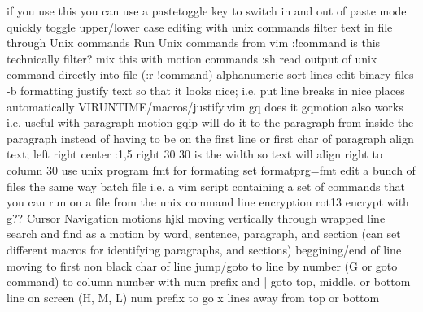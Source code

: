 \documentclass[12pt]{book}
\begin{document}
        if you use this you can use a pastetoggle key to switch in and out of paste mode quickly
  toggle upper/lower case
  editing with unix commands
    filter text in file through Unix commands
    Run Unix commands from vim
      :!command
        is this technically filter?
        mix this with motion commands
      :sh
      read output of unix command directly into file (:r !command)
  alphanumeric sort lines
  edit binary files -b
  formatting
    justify text so that it looks nice; i.e. put line breaks in nice places automatically
      VIRUNTIME/macros/justify.vim
      gq does it
      gqmotion also works i.e. useful with paragraph motion
      gqip will do it to the paragraph from inside the paragraph instead of having to be on the first line or first char of paragraph
    align text; left right center
      :1,5 right 30
      30 is the width so text will align right to column 30
    use unix program fmt for formating
      set formatprg=fmt
  edit a bunch of files the same way
    batch file i.e. a vim script containing a set of commands that you can run on a file from the unix command line
  encryption
    rot13 encrypt with g??
Cursor Navigation
  motions
    hjkl
    moving vertically through wrapped line
    search and find as a motion
    by word, sentence, paragraph, and section (can set different macros for identifying paragraphs, and sections)
    beggining/end of line
    moving to first non black char of line
    jump/goto
      to line by number (G or goto command)
      to column number with num prefix and |
      goto top, middle, or bottom line on screen (H, M, L) num prefix to go x lines away from top or bottom
\end{document}
